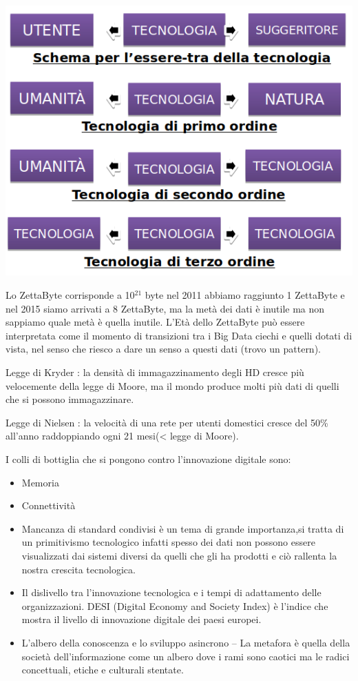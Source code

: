 \documentclass[]{article}
\begin{document}
\includegraphics[scale=0.6]{image2.png}

Lo ZettaByte corrisponde a 10$^{21}$ byte nel 2011 abbiamo raggiunto 1
ZettaByte e nel 2015 siamo arrivati a 8 ZettaByte, ma la metà dei dati è
inutile ma non sappiamo quale metà è quella inutile. L'Età dello
ZettaByte può essere interpretata come il momento di transizioni tra i
Big Data ciechi e quelli dotati di vista, nel senso che riesco a dare un
senso a questi dati (trovo un pattern).

Legge di Kryder : la densità di immagazzinamento degli HD cresce più
velocemente della legge di Moore, ma il mondo produce molti più dati di
quelli che si possono immagazzinare.

Legge di Nielsen : la velocità di una rete per utenti domestici cresce
del 50\% all'anno raddoppiando ogni 21 mesi(\textless{} legge di Moore).

I colli di bottiglia che si pongono contro l'innovazione digitale sono:

\begin{itemize}
	 
	\item
	Memoria
	\item
	Connettività
	\item
	Mancanza di standard condivisi è un tema di grande importanza,si 
	tratta di un primitivismo tecnologico infatti
	spesso dei dati non possono essere visualizzati dai sistemi diversi da
	quelli che gli ha prodotti e ciò rallenta la nostra crescita
	tecnologica. 
	\item
	Il dislivello tra l'innovazione tecnologica e i tempi di adattamento
	delle organizzazioni. DESI (Digital Economy and Society Index) è
	l'indice che mostra il livello di innovazione digitale dei paesi
	europei.
	\item
	L'albero della conoscenza e lo sviluppo asincrono -- La metafora è
	quella della società dell'informazione come un albero dove i rami sono
	caotici ma le radici concettuali, etiche e culturali stentate.
\end{itemize}
\end{document}
